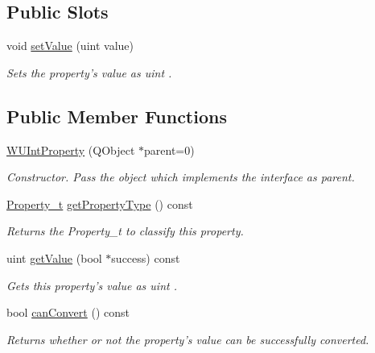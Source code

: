 \subsection*{Public Slots}
\begin{DoxyCompactItemize}
\item 
void \hyperlink{class_w_u_int_property_a05e1e1e89a9295007ffea09ea46a0ac4}{set\-Value} (uint value)
\begin{DoxyCompactList}\small\item\em Sets the property's value as uint . \end{DoxyCompactList}\end{DoxyCompactItemize}
\subsection*{Public Member Functions}
\begin{DoxyCompactItemize}
\item 
\hyperlink{class_w_u_int_property_a7bd95ff163ad1bf9fcd995aff49919f5}{W\-U\-Int\-Property} (Q\-Object $\ast$parent=0)
\begin{DoxyCompactList}\small\item\em Constructor. Pass the object which implements the interface as parent. \end{DoxyCompactList}\item 
\hyperlink{group___property_classes_ga38f1ccddda12c7cb50b868c9f789ee37}{Property\-\_\-t} \hyperlink{class_w_u_int_property_aca0e744b443199cc75c68bf4f4a3e67b}{get\-Property\-Type} () const 
\begin{DoxyCompactList}\small\item\em Returns the Property\-\_\-t to classify this property. \end{DoxyCompactList}\item 
uint \hyperlink{class_w_u_int_property_af79534aa085135c8c642a1e929119147}{get\-Value} (bool $\ast$success) const 
\begin{DoxyCompactList}\small\item\em Gets this property's value as uint . \end{DoxyCompactList}\item 
bool \hyperlink{class_w_u_int_property_a27a4e53bf0702e796c6eecfbe9803221}{can\-Convert} () const 
\begin{DoxyCompactList}\small\item\em Returns whether or not the property's value can be successfully converted. \end{DoxyCompactList}\end{DoxyCompactItemize}

